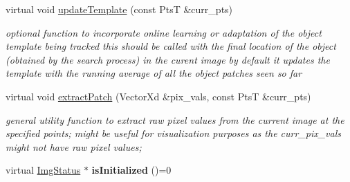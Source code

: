 \begin{DoxyCompactItemize}
\item 
\hypertarget{classImageBase_ab356e9ea42029bdf2e527e517da9f524}{virtual void \hyperlink{classImageBase_ab356e9ea42029bdf2e527e517da9f524}{update\-Template} (const Pts\-T \&curr\-\_\-pts)}\label{classImageBase_ab356e9ea42029bdf2e527e517da9f524}

\begin{DoxyCompactList}\small\item\em optional function to incorporate online learning or adaptation of the object template being tracked this should be called with the final location of the object (obtained by the search process) in the curent image by default it updates the template with the running average of all the object patches seen so far \end{DoxyCompactList}\item 
\hypertarget{classImageBase_a296af969f6f7b03c850007076397a026}{virtual void \hyperlink{classImageBase_a296af969f6f7b03c850007076397a026}{extract\-Patch} (Vector\-Xd \&pix\-\_\-vals, const Pts\-T \&curr\-\_\-pts)}\label{classImageBase_a296af969f6f7b03c850007076397a026}

\begin{DoxyCompactList}\small\item\em general utility function to extract raw pixel values from the current image at the specified points; might be useful for visualization purposes as the curr\-\_\-pix\-\_\-vals might not have raw pixel values; \end{DoxyCompactList}\item 
\hypertarget{classImageBase_ae8f0d73deaf9ddd78ba37120b164e5b0}{virtual \hyperlink{structImgStatus}{Img\-Status} $\ast$ {\bfseries is\-Initialized} ()=0}\label{classImageBase_ae8f0d73deaf9ddd78ba37120b164e5b0}

\end{DoxyCompactItemize}
